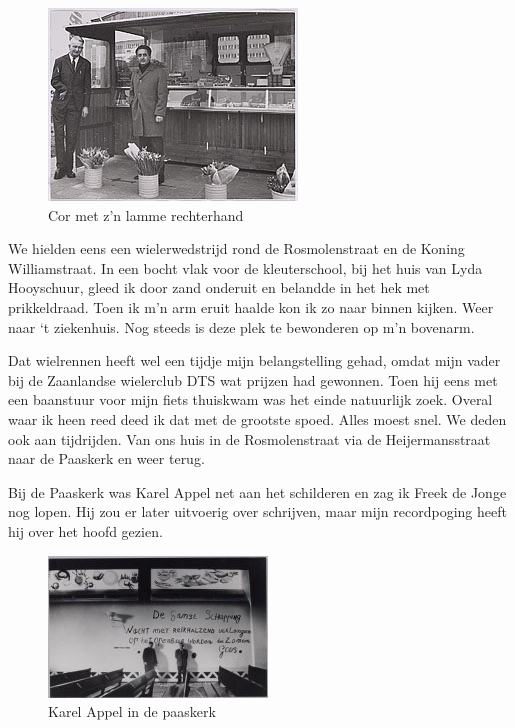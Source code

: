 \documentclass[12pt,twoside]{memoir}
\begin{document}
\begin{figure}
\includegraphics[width=\textwidth]{img/ch12/knikker}
\caption*{\footnotesize Cor met z'n lamme rechterhand}
\end{figure}

We hielden eens een wielerwedstrijd rond de Rosmolenstraat en de Koning Williamstraat. In een bocht vlak voor de kleuterschool, bij het huis van Lyda Hooyschuur, gleed ik door zand onderuit en belandde in het hek met prikkeldraad. Toen ik m’n arm eruit haalde kon ik zo naar binnen kijken. Weer naar ‘t ziekenhuis. Nog steeds is deze plek te bewonderen op m’n bovenarm. 

Dat wielrennen heeft wel een tijdje mijn belangstelling gehad, omdat mijn vader bij de Zaanlandse wielerclub DTS wat prijzen had gewonnen. Toen hij eens met een baanstuur voor mijn fiets thuiskwam was het einde natuurlijk zoek. Overal waar ik heen reed deed ik dat met de grootste spoed. Alles moest snel. We deden ook aan tijdrijden. Van ons huis in de Rosmolenstraat via de Heijermansstraat naar de Paaskerk en weer terug.

Bij de Paaskerk was Karel Appel net aan het schilderen en zag ik Freek de Jonge nog lopen. Hij zou er later uitvoerig over schrijven, maar mijn recordpoging heeft hij over het hoofd gezien. 

\begin{figure}
\includegraphics[width=\textwidth]{img/ch12/paaskerk}
\caption*{\footnotesize Karel Appel in de paaskerk}
\end{figure}
\end{document}
